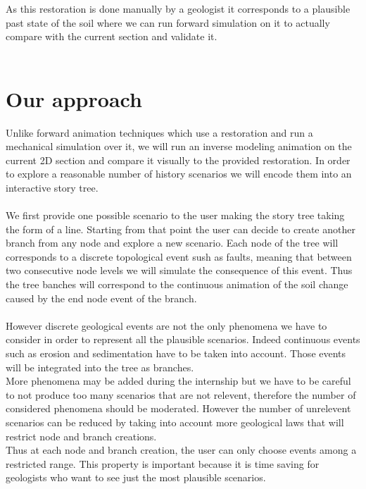 \documentclass[a4paper,11pt]{article}
\begin{document}
As this restoration is done manually by a geologist it corresponds to a plausible past state of the soil where we can run forward simulation on it to actually compare with the current section and validate it. \\\\

\section{Our approach}

Unlike forward animation techniques which use a restoration and run a mechanical simulation over it, we will run an inverse modeling animation on the current 2D section and compare it visually to the provided restoration. 
In order to explore a reasonable number of history scenarios we will encode them into an interactive story tree.\\\\
We first provide one possible scenario to the user making the story tree taking the form of a line. Starting from that point the user can decide to create another branch from any node and explore a new scenario. 
Each node of the tree will corresponds to a discrete topological event sush as faults, meaning that between two consecutive node levels we will simulate the consequence of this event. Thus the tree banches will correspond to the continuous animation of the soil change caused by the end node event of the branch. \\\\
However discrete geological events are not the only phenomena we have to consider in order to represent all the plausible scenarios. Indeed continuous events such as erosion and sedimentation have to be taken into account. Those events will be integrated into the tree as branches.\\
More phenomena may be added during the internship but we have to be careful to not produce too many scenarios that are not relevent, therefore the number of considered phenomena should be moderated.
However the number of unrelevent scenarios can be reduced by taking into account more geological laws that will restrict node and branch creations.\\
Thus at each node and branch creation, the user can only choose events among a restricted range. This property is important because it is time saving for geologists who want to see just the most plausible scenarios.\\\\
\end{document}
